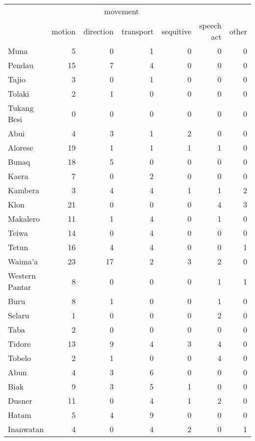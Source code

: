 \begin{table}


\begin{tabular}{lrrrrrr}
\lsptoprule
& \multicolumn{4}{c|}{movement} & & \\
 & {motion} & {direction} & {transport} & {sequitive} & {speech act} & {other}\\ 
  \hline
  Muna &   5 &   0 &   1 &   0 &   0 &   0  \\ 
  Pendau &  15 &   7 &   4 &   0 &   0 &   0 \\ 
  Tajio &   3 &   0 &   1 &   0 &   0 &   0 \\ 
  Tolaki &   2 &   1 &   0 &   0 &   0 &   0 \\ 
  Tukang Besi & 0 & 0 & 0 & 0 & 0 & 0 \\ \hline
  Abui &   4 &   3 &   1 &   2 &   0 &   0 \\ 
  Alorese &  19 &   1 &   1 &   1 &   1 &   0 \\ 
  Bunaq &  18 &   5 &   0 &   0 &   0 &   0 \\ 
  Kaera &   7 &   0 &   2 &   0 &   0 &   0 \\ 
  Kambera &   3 &   4 &   4 &   1 &   1 &   2 \\ 
  Klon &  21 &   0 &   0 &   0 &   4 &   3 \\ 
  Makalero &  11 &   1 &   4 &   0 &   1 & 0  \\ 
  Teiwa &   14 &   0 &   4 &   0 &   0 &   0 \\ 
  Tetun &  16 &   4 &   4 &   0 &   0 &   1 \\ 
  Waima'a &  23 &  17 &   2 &   3 &   2 &   0 \\ 
  Western Pantar &   8 &   0 &   0 &   0 &   1 &   1 \\ \hline
  Buru & 8 & 1 & 0 & 0 & 1 & 0 \\
  Selaru &   1 &   0 &   0 &   0 &   2 &   0 \\ 
  Taba &   2 &   0 &   0 &   0 &   0 &   0 \\ 
  Tidore & 13 & 9 & 4 & 3 & 4 & 0 \\
  Tobelo &   2 &   1 &   0 &   0 &   4 &   0 \\ \hline
  Abun &   4 &   3 &   6 &   0 &   0 &   0 \\ 
  Biak &   9 &   3 &   5 &   1 &   0 &   0 \\ 
  Dusner &  11 &   0 &   4 &   1 &   2 &   0 \\ 
  Hatam &   5 &   4 &   9 &   0 &   0 &   0 \\ 
  Inanwatan &   4 &   0 &   4 &   2 &   0 &   1 \\ 

\end{tabular}
\end{table}
